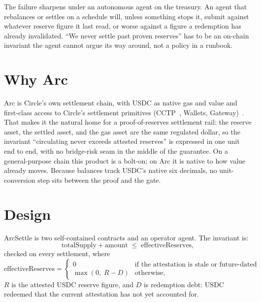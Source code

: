 \documentclass[11pt]{article}
\begin{document}
The failure sharpens under an autonomous agent on the treasury. An agent that
rebalances or settles on a schedule will, unless something stops it, submit against
whatever reserve figure it last read, or worse against a figure a redemption has already
invalidated. ``We never settle past proven reserves'' has to be an on-chain invariant
the agent cannot argue its way around, not a policy in a runbook.

\section{Why Arc}
Arc is Circle's own settlement chain, with USDC as native gas and value and first-class
access to Circle's settlement primitives (CCTP~\cite{cctp}, Wallets,
Gateway)~\cite{circlearc}. That makes it the natural home for a proof-of-reserves
settlement rail: the reserve asset, the settled asset, and the gas asset are the same
regulated dollar, so the invariant ``circulating never exceeds attested reserves'' is
expressed in one unit end to end, with no bridge-risk seam in the middle of the
guarantee. On a general-purpose chain this product is a bolt-on; on Arc it is native to
how value already moves. Because balances track USDC's native six decimals, no
unit-conversion step sits between the proof and the gate.

\section{Design}
ArcSettle is two self-contained contracts and an operator agent. The invariant is:
\[
\text{totalSupply} + \text{amount} \;\le\; \text{effectiveReserves},
\]
checked on every settlement, where
\[
\text{effectiveReserves} =
\begin{cases}
0 & \text{if the attestation is stale or future-dated} \\
\max(0,\; R - D) & \text{otherwise,}
\end{cases}
\]
$R$ is the attested USDC reserve figure, and $D$ is redemption debt: USDC redeemed that
the current attestation has not yet accounted for.
\end{document}
